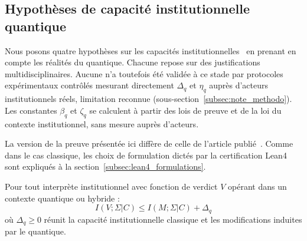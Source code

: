 \subsection{Hypoth\`eses de capacit\'e institutionnelle quantique}
\label{subsec:hypotheses_quantiques}

\begin{sloppypar}
Nous posons quatre hypoth\`eses sur les capacit\'es
institutionnelles~\cite{Simon1955,Miller56,Ericsson95,Kahneman11} en
prenant en compte les r\'ealit\'es du quantique. Chacune repose sur des
justifications multidisciplinaires. Aucune n'a toutefois \'et\'e valid\'ee \`a ce
stade par protocoles exp\'erimentaux contr\^ol\'es mesurant directement
$\Delta_q$ et $\eta_q$ aupr\`es d'acteurs institutionnels
r\'eels, limitation reconnue
(sous-section~\ref{subsec:note_methodo}). Les constantes $\beta_q$ et $\zeta_q$ se calculent \`a partir des lois de
preuve et de la loi du contexte institutionnel, sans mesure aupr\`es d'acteurs.

\begin{remark}
\label{rem:version_preuve_pq}
La version de la preuve pr\'esent\'ee ici diff\`ere de celle de l'article
publi\'e~\cite{MINKA2026PQCRO}. Comme dans le cas classique, les choix de formulation dict\'es
par la certification Lean4 sont expliqu\'es \`a la
section~\ref{subsec:lean4_formulations}.
\end{remark}

\begin{assumption}
\label{ass:extraction_quantique}
Pour tout interpr\`ete institutionnel avec fonction de verdict $V$
op\'erant dans un contexte quantique ou hybride :
\begin{equation}
I(V; \Sigma|C) \leq I(M; \Sigma|C) + \Delta_q
\label{eq:extraction_quantique}
\end{equation}
o\`u $\Delta_q \geq 0$ r\'eunit la capacit\'e institutionnelle
classique et les modifications induites par le quantique.
\end{assumption}


\end{sloppypar}
